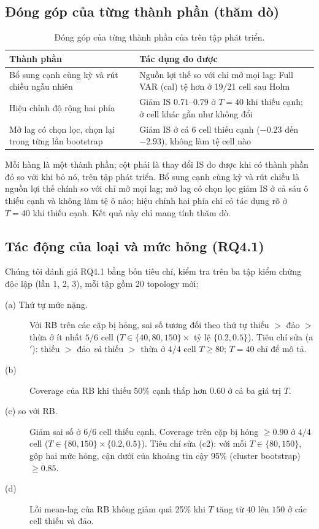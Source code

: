 \subsection{Đóng góp của từng thành phần (thăm dò)}
\begin{table}[H]
\centering\small
\begin{tabularx}{\textwidth}{>{\raggedright\arraybackslash}p{5.3cm}Y}
\toprule
Thành phần & Tác dụng đo được\\
\midrule
Bổ sung cạnh cùng kỳ và rút chiều ngẫu nhiên & Nguồn lợi thế so với chỉ mở mọi lag: Full VAR (cal) tệ hơn ở 19/21 cell sau Holm\\
Hiệu chỉnh độ rộng hai phía & Giảm IS $0.71$--$0.79$ ở $T=40$ khi thiếu cạnh; ở cell khác gần như không đổi\\
Mở lag có chọn lọc, chọn lại trong từng lần bootstrap & Giảm IS ở cả 6 cell thiếu cạnh ($-0.23$ đến $-2.93$), không làm tệ cell nào\\
\bottomrule
\end{tabularx}
\caption{Đóng góp của từng thành phần của \ours{} trên tập phát triển.}
\end{table}

Mỗi hàng là một thành phần; cột phải là thay đổi IS đo được khi có thành phần đó so với khi bỏ nó, trên tập phát triển. Bổ sung cạnh cùng kỳ và rút chiều là nguồn lợi thế chính so với chỉ mở mọi lag; mở lag có chọn lọc giảm IS ở cả sáu ô thiếu cạnh và không làm tệ ô nào; hiệu chỉnh hai phía chỉ có tác dụng rõ ở $T=40$ khi thiếu cạnh. Kết quả này chỉ mang tính thăm dò.

\subsection{Tác động của loại và mức hỏng (RQ4.1)}\label{sec:rq41}
Chúng tôi đánh giá RQ4.1 bằng bốn tiêu chí, kiểm tra trên ba tập kiểm chứng độc lập (lần 1, 2, 3), mỗi tập gồm 20 topology mới:
\begin{description}
  \item[(a) Thứ tự mức nặng.] Với RB trên các cặp bị hỏng, sai số tương đối theo thứ tự thiếu $>$ đảo $>$ thừa ở ít nhất $5/6$ cell ($T\in\{40,80,150\}\times$ tỷ lệ $\{0.2,0.5\}$). Tiêu chí sửa (a$'$): thiếu $>$ đảo \emph{và} thiếu $>$ thừa ở $4/4$ cell $T\ge80$; $T=40$ chỉ để mô tả.
  \item[(b)] Coverage của RB khi thiếu 50\% cạnh thấp hơn $0.60$ ở cả ba giá trị $T$.
  \item[(c) \ours{} so với RB.] Giảm sai số ở $6/6$ cell thiếu cạnh. Coverage trên cặp bị hỏng $\ge0.90$ ở $4/4$ cell ($T\in\{80,150\}\times\{0.2,0.5\}$). Tiêu chí sửa (c2): với mỗi $T\in\{80,150\}$, gộp hai mức hỏng, cận dưới của khoảng tin cậy 95\% (cluster bootstrap) $\ge0.85$.
  \item[(d)] Lỗi mean-lag của RB không giảm quá 25\% khi $T$ tăng từ $40$ lên $150$ ở các cell thiếu và đảo.
\end{description}

